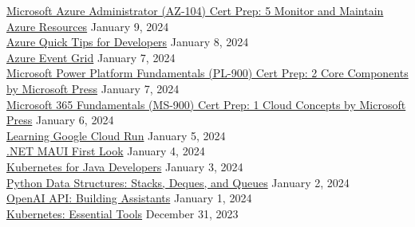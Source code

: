 \documentclass[10pt]{res} %
\begin{document}
\begin{resume}
\href{https://www.linkedin.com/learning/certificates/6e2c33661b32d4ab902f309de61be0f42e94fae4475bea9a2159993fe112a5b0}{\color{blue}Microsoft Azure Administrator (AZ-104) Cert Prep: 5 Monitor and Maintain Azure Resources} \hfill January 9, 2024 \\
\href{https://www.linkedin.com/learning/certificates/d054b1155b236fa61a631bcf627ba7cc9bf3b93db2a77e9acdd0cde37a6115e3}{\color{blue}Azure Quick Tips for Developers} \hfill January 8, 2024 \\
\href{https://www.linkedin.com/learning/certificates/1a31b7d3e1c6d51d6cec9ade68ae9dc8b5b3f6af76764857a9522aa96a7a6bd2}{\color{blue}Azure Event Grid} \hfill January 7, 2024 \\
\href{https://www.linkedin.com/learning/certificates/24b4d0377d895b8c3efb2d770f0e5fd22e802a444122e6723f3f1dfe642218de}{\color{blue}Microsoft Power Platform Fundamentals (PL-900) Cert Prep: 2 Core Components by Microsoft Press} \hfill January 7, 2024 \\
\href{https://www.linkedin.com/learning/certificates/7bf719f39860cad1a758c5ff8f98ff45eceba0178609cb8b5820954aca58f4d6}{\color{blue}Microsoft 365 Fundamentals (MS-900) Cert Prep: 1 Cloud Concepts by Microsoft Press} \hfill January 6, 2024 \\
\href{https://www.linkedin.com/learning/certificates/babfa865ff59b484453533583036dfd944d5e1826ed60de874a4f89969033acb}{\color{blue}Learning Google Cloud Run} \hfill January 5, 2024 \\
\href{https://www.linkedin.com/learning/certificates/f964da001dac99ec5fe8b79136617dafc8361bcf396a53071572508f6bdab45a}{\color{blue}.NET MAUI First Look} \hfill January 4, 2024 \\
\href{https://www.linkedin.com/learning/certificates/7c122b40300df38447b2ccbde7e0fdea496e99b100d8320d4b6362e97b48897a}{\color{blue}Kubernetes for Java Developers} \hfill January 3, 2024 \\
\href{https://www.linkedin.com/learning/certificates/66771035c0be9f5357e076065d75b3fc1bde8dc6cbff7a7d3469d046a97d5867}{\color{blue}Python Data Structures: Stacks, Deques, and Queues} \hfill January 2, 2024 \\
\href{https://www.linkedin.com/learning/certificates/545d2232fed87ba7081c911707490444d7c4e01d4f2e55787f77bdd4f21e921c}{\color{blue}OpenAI API: Building Assistants} \hfill January 1, 2024 \\
\href{https://www.linkedin.com/learning/certificates/3074d8c05e8b40cfec1b4b9daa665e61ef80cdddda340d70cb2eb5662be7de8a}{\color{blue}Kubernetes: Essential Tools} \hfill December 31, 2023 \\

\end{resume}
\end{document}
